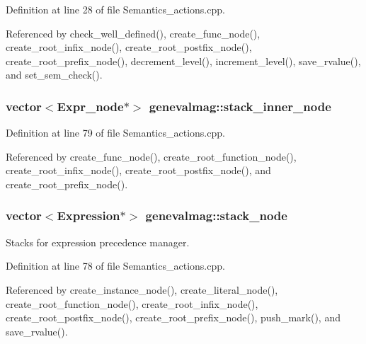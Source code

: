 Definition at line 28 of file Semantics\_\-actions.cpp.



Referenced by check\_\-well\_\-defined(), create\_\-func\_\-node(), create\_\-root\_\-infix\_\-node(), create\_\-root\_\-postfix\_\-node(), create\_\-root\_\-prefix\_\-node(), decrement\_\-level(), increment\_\-level(), save\_\-rvalue(), and set\_\-sem\_\-check().

\hypertarget{namespacegenevalmag_a0b445db6f5f211e8d78b693596cbda3c}{
\subsubsection[{stack\_\-inner\_\-node}]{\setlength{\rightskip}{0pt plus 5cm}vector$<${\bf Expr\_\-node}$\ast$$>$ {\bf genevalmag::stack\_\-inner\_\-node}}}
\label{namespacegenevalmag_a0b445db6f5f211e8d78b693596cbda3c}


Definition at line 79 of file Semantics\_\-actions.cpp.



Referenced by create\_\-func\_\-node(), create\_\-root\_\-function\_\-node(), create\_\-root\_\-infix\_\-node(), create\_\-root\_\-postfix\_\-node(), and create\_\-root\_\-prefix\_\-node().

\hypertarget{namespacegenevalmag_a47998af84055c40ecfcdfe156f71be04}{
\subsubsection[{stack\_\-node}]{\setlength{\rightskip}{0pt plus 5cm}vector$<${\bf Expression}$\ast$$>$ {\bf genevalmag::stack\_\-node}}}
\label{namespacegenevalmag_a47998af84055c40ecfcdfe156f71be04}
Stacks for expression precedence manager. 

Definition at line 78 of file Semantics\_\-actions.cpp.



Referenced by create\_\-instance\_\-node(), create\_\-literal\_\-node(), create\_\-root\_\-function\_\-node(), create\_\-root\_\-infix\_\-node(), create\_\-root\_\-postfix\_\-node(), create\_\-root\_\-prefix\_\-node(), push\_\-mark(), and save\_\-rvalue().

